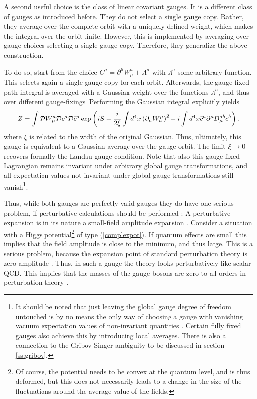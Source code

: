 \documentclass[final,12pt]{article}
\newcommand*{\no}{\noindent}
\newcommand*{\be}{\begin{equation}}
\newcommand*{\ee}{\end{equation}}
\newcommand*{\pd}{\partial}
\newcommand*{\pdm}{\pd_{\mu}}
\newcommand*{\pref}[1]{(\ref{#1})}
\newcommand*{\nn}{\nonumber}
\newcommand*{\1}{1\!\!\!\bot}
\begin{document}
A second useful choice is the class of linear covariant gauges. It is a different class of gauges as introduced before. They do not select a single gauge copy. Rather, they average over the complete orbit with a uniquely defined weight, which makes the integral over the orbit finite. However, this is implemented by averaging over gauge choices selecting a single gauge copy. Therefore, they generalize the above construction.

To do so, start from the choice $C^a=\pd^\mu W_\mu^a+\Lambda^a$ with $\Lambda^a$ some arbitrary function. This selects again a single gauge copy for each orbit. Afterwards, the gauge-fixed path integral is averaged with a Gaussian weight over the functions $\Lambda^a$, and thus over different gauge-fixings. Performing the Gaussian integral explicitly yields \cite{Bohm:2001yx}
\be
Z=\int{\cal D}W_\mu^a{\cal D}c^a{\cal D}{\bar c}^a\exp\left(iS-\frac{i}{2\xi}\int d^4 x\left(\pdm W^\mu_a\right)^2-i\int d^4x \bar{c}^a\pd^\mu D_\mu^{ab} c^b\right)\nn.
\ee
\no where $\xi$ is related to the width of the original Gaussian. Thus, ultimately, this gauge is equivalent to a Gaussian average over the gauge orbit. The limit $\xi\to 0$ recovers formally the Landau gauge condition. Note that also this gauge-fixed Lagrangian remains invariant under arbitrary global gauge transformations, and all expectation values not invariant under global gauge transformations still vanish\footnote{It should be noted that just leaving the global gauge degree of freedom untouched is by no means the only way of choosing a gauge with vanishing vacuum expectation values of non-invariant quantities \cite{Strocchi:1985cf}. Certain fully fixed gauges also achieve this by introducing local averages. There is also a connection to the Gribov-Singer ambiguity to be discussed in section \ref{ss:gribov}.}.

Thus, while both gauges are perfectly valid gauges they do have one serious problem, if perturbative calculations should be performed \cite{Lee:1974zg}: A perturbative expansion is in its nature a small-field amplitude expansion \cite{Rivers:1987hi}. Consider a situation with a Higgs potential\footnote{Of course, the potential needs to be convex at the quantum level, and is thus deformed, but this does not necessarily leads to a change in the size of the fluctuations around the average value of the fields.} of type \pref{complexpot}. If quantum effects are small this implies that the field amplitude is close to the minimum, and thus large. This is a serious problem, because the expansion point of standard perturbation theory is zero amplitude \cite{Bohm:2001yx}. Thus, in such a gauge the theory looks perturbatively like scalar QCD. This implies that the masses of the gauge bosons are zero to all orders in perturbation theory \cite{Bohm:2001yx}.
\end{document}
